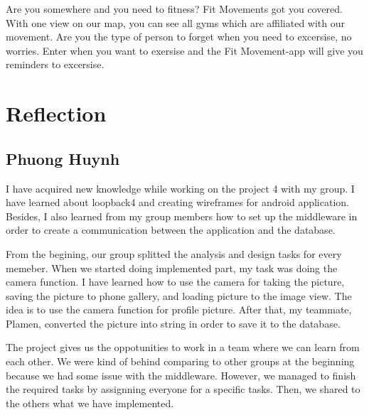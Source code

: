 \documentclass{article}
\begin{document}
Are you somewhere and you need to fitness? Fit Movements got you covered. With one view on our map, you can see all gyms which are affiliated with our movement. Are you the type of person to forget when you need to excersise, no worries. Enter when you want to exersise and the Fit Movement-app will give you reminders to excersise.\\

\section*{Reflection}
\subsection*{Phuong Huynh}
I have acquired new knowledge while working on the project 4 with my group. I have learned about loopback4 and creating wireframes for android application. Besides, I also learned from my group members how to set up the middleware in order to create a communication between the application and the database.

From the begining, our group splitted the analysis and design tasks for every memeber. When we started doing implemented part, my task was doing the camera function. I have learned how to use the camera for taking the picture, saving the picture to phone gallery, and loading picture to the image view. The idea is to use the camera function for profile picture. After that, my teammate, Plamen, converted the picture into string in order to save it to the database.

The project gives us the oppotunities to work in a team where we can learn from each other. We were kind of behind comparing to other groups at the beginning because we had some issue with the middleware. However, we managed to finish the required tasks by assignning everyone for a specific tasks. Then, we shared to the others what we have implemented.
\end{document}
